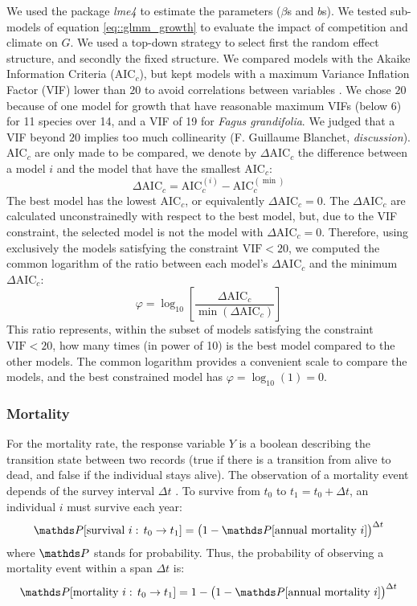 We used the package \textit{lme4} \citep{lme4} to estimate the parameters ($ \beta $s and $ b $s). We tested sub-models of equation \eqref{eq::glmm_growth} to evaluate the impact of competition and climate on $ G $. We used a top-down strategy to select first the random effect structure, and secondly the fixed structure. We compared models with the Akaike Information Criteria ($ \text{AIC}_c $), but kept models with a maximum Variance Inflation Factor (VIF) lower than $ 20 $ to avoid correlations between variables \citep{Zuur2010}. We chose $ 20 $ because of one model for growth that have reasonable maximum VIFs (below 6) for 11 species over 14, and a VIF of 19 for \textit{Fagus grandifolia}. We judged that a VIF beyond $ 20 $ implies too much collinearity (F. Guillaume Blanchet, \textit{discussion}). $ \text{AIC}_c $ are only made to be compared, we denote by $ \Delta \text{AIC}_c $ the difference between a model $ i $ and the model that have the smallest $ \text{AIC}_c $:
\[
	\Delta \text{AIC}_c = \text{AIC}_c^{(i)} - \text{AIC}_c^{(\min)}
\]
The best model has the lowest $ \text{AIC}_c $, or equivalently $ \Delta \text{AIC}_c = 0 $. The $ \Delta \text{AIC}_c $ are calculated unconstrainedly with respect to the best model, but, due to the VIF constraint, the selected model is not the model with $ \Delta \text{AIC}_c = 0 $. Therefore, using exclusively the models satisfying the constraint $ \text{VIF} < 20 $, we computed the common logarithm of the ratio between each model's $ \Delta \text{AIC}_c $ and the minimum $ \Delta \text{AIC}_c $:
\begin{equation} \label{eq::ratio}
	\varphi = \log_{10}\left[ \frac{\Delta \text{AIC}_c}{\min \left( \Delta \text{AIC}_c \right)} \right]
\end{equation}
This ratio represents, within the subset of models satisfying the constraint $ \text{VIF} < 20 $, how many times (in power of 10) is the best model compared to the other models. The common logarithm provides a convenient scale to compare the models, and the best constrained model has $ \varphi = \log_{10}(1) = 0 $.

\subsubsection{Mortality}
For the mortality rate, the response variable $ Y $ is a boolean describing the transition state between two records (true if there is a transition from alive to dead, and false if the individual stays alive). The observation of a mortality event depends of the survey interval $ \Delta t $ \citep{Lines2010}. To survive from $ t_0 $ to $ t_1 = t_0 + \Delta t $, an individual $ i $ must survive each year:
\[
	\Prob[\text{survival } i: \, t_0 \to t_1] = \big(1 - \Prob[\text{annual mortality } i]\big)^{\Delta t}
\]
where $ \Prob $ stands for probability. Thus, the probability of observing a mortality event within a span $ \Delta t $ is:
\[
	\Prob[\text{mortality } i: \, t_0 \to t_1] = 1 - \big(1 - \Prob[\text{annual mortality } i]\big)^{\Delta t}
\]

